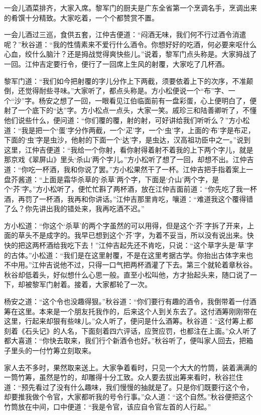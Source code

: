 \documentclass[12pt,UTF8]{ctexbook}
\begin{document}
{{{一会儿酒菜排齐，大家入席。黎军门的厨夫是广东全省第一个烹调名手，烹调出来的肴馔十分精致。大家吃着，一个个都赞赏不置。

一会儿酒过三巡，食供五套，江仲吉便道：“闷酒无味，我们何不行过酒令消遣呢？”秋谷道：“我的性情素来不爱行什么酒令。你想好好的吃酒，何必要来呕什么心血，绞什么脑汁？还是拇战觉得爽快些儿。”说着，黎军门点头称是。大家拇战了一回。江仲吉定要行令，便行了一回席上生风的射覆，大家吃了几杯酒。

黎军门道：“我们如今把射覆的字儿分作上下两截，须要依着上下的次序，不准颠倒，还觉得耐些寻味。”大家听了，都点头称是。方小松便说一个“布”字、一个“沙”字。杨安之想了一回，一眼看见江伯临面前有一盘彩蛋，心上便明白了，便射了一个底下的“达”字。方小松点一点头，大家一笑。戚珍三和陆善卿听了，不懂他们说些什么，便问道：“你们覆的覆，射的射，可好讲给我们听听么？”方小松道：“我是把一个‘蛋’字分作两截，一个‘疋’字，一个‘虫’字，上面的‘布’字是布疋，下面的‘虫’字是虫沙，他射的下面一个‘达’字，是虫达，汉高祖功臣中之一。”说到这里，江仲吉便道：“我给一个你射，看你射得着射不着我的上下两个字儿，就是那京戏《翠屏山》里头‘杀山’两个字儿。”方小松听了想了一回，却想不出。江仲吉道：“你吃一杯酒，我和你说了罢。”方小松果然干了一杯。江仲吉把手指着案上一盘芥酱道：“上面是霜华杀草的‘杀草’两个字，下面是‘介山’两个字，是个‘芥’字。”方小松听了，便忙忙斟了两杯酒，放在江仲吉面前道：“你先吃了我一杯酒，再罚了一杯酒，我再和你讲话。”江仲吉那里肯吃，嚷道：“难道我这个覆得错了么？你先讲出我的错处来，我再吃酒不迟。”

方小松道：“你这个‘杀草’的两个字虽然的可以用得，但是这个‘芥’字拆了开来，上面的草头不是成字的。我早已想到这个‘芥’字，为着不妥当，所以没有说出来。快快的把这两杯酒给我吃下去！”江仲吉起先还不肯吃，只说：“这个草字头是‘草’字的古体。”小松道：“我们是在这里射覆，不是在这里考据古学。你抬出古体字来也不中用。”江仲吉说他不过，只得一口气把两杯酒灌了下去。第三个就轮着章秋谷。秋谷却低着头，好似想什么心思一般。直至小松叫他，方才抬起头来，随口说了一下，却被黎军门射着。接着，大家都轮了一次。

杨安之道：“这个令也没趣得狠。”秋谷道：“你们要行有趣的酒令，我倒带着一付酒筹在这里。本来是一个朋友托我作的，后来这个人到关东去了。这付酒筹刚刚带在这里，行起来却狠有些味儿。”众人听了，便问是什么酒筹。秋谷道：“这付筹上都刻着《石头记》的人名，下面刻着四六评话，应贺应罚，也都注在上面。”众人听了都大喜道：“你快去取来，我们行个新酒令也好。”秋谷听了，便叫家人回去，把箱子里头的一付竹筹立刻取来。

家人去不多时，果然取来送上。大家争着看时，只见一个大大的竹筒，装着满满的一筒竹筹，虽然是竹的，却雕得十分工致。众人要去拔出筹来看时，秋谷拦住道：“预先看过了没有什么趣味，我们慢慢的抽就是了。只是你们既要行这个令，却要推我做个令官，大家都听我的号令行事。”众人道：“这个自然。”秋谷便把这个竹筒放在中间，口中便道：“我是令官，该应自令官左首的人行起。”

}}}
\end{document}
